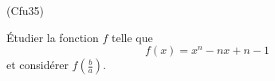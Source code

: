 \begin{tiny}(Cfu35)\end{tiny}
\'Etudier la fonction $f$ telle que 
\[f(x) = x^n - nx + n-1\]
et considérer $f(\frac{b}{a})$.